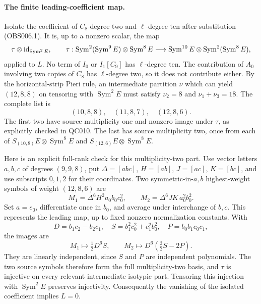 \paragraph{The finite leading-coefficient map.}
Isolate the coefficient of $C_8$-degree two and $\ell$-degree ten after
substitution (OBS006.1). It is, up to a nonzero scalar, the map
\[
 \tau\otimes{\rm id}_{\operatorname{Sym}^2 E},\qquad
 \tau:\operatorname{Sym}^2(\operatorname{Sym}^9 E)\otimes
              \operatorname{Sym}^8 E
       \longrightarrow
       \operatorname{Sym}^{10}E\otimes
              \operatorname{Sym}^2(\operatorname{Sym}^8 E),
\]
applied to $L$.
No term of $I_0$ or $I_1[C_9]$ has $\ell$-degree ten.
The contribution of $A_0$ involving two copies of $C_8$ has
$\ell$-degree two, so it does not contribute either.
By the horizontal-strip Pieri rule, an intermediate partition $\nu$
which can yield $(12,8,8)$ on tensoring with $\operatorname{Sym}^2 E$
must satisfy $\nu_2=8$ and $\nu_1+\nu_3=18$.
The complete list is
\[
 (10,8,8),\quad (11,8,7),\quad (12,8,6).
\]
The first two have source multiplicity one and nonzero image under
$\tau$, as explicitly checked in QC010.
The last has source multiplicity two, once from each of
$S_{(10,8)}E\otimes\operatorname{Sym}^8 E$ and
$S_{(12,6)}E\otimes\operatorname{Sym}^8 E$.

Here is an explicit full-rank check for this multiplicity-two part.
Use vector letters $a,b,c$ of degrees $(9,9,8)$, put
$\Delta=[abc]$, $H=[ab]$, $J=[ac]$, $K=[bc]$, and use subscripts $0,1,2$
for their coordinates. Two symmetric-in-$a,b$ highest-weight symbols of
weight $(12,8,6)$ are
\[
 M_1=\Delta^6H^2a_0b_0c_0^2,\qquad
 M_2=\Delta^6JK\,a_0^2b_0^2.
\]
Set $a=e_0$, differentiate once in $b_0$, and average under interchange
of $b,c$. This represents the leading map, up to fixed nonzero
normalization constants. With
\[
 D=b_1c_2-b_2c_1,\quad
 S=b_1^2c_0^2+c_1^2b_0^2,\quad
 P=b_0b_1c_0c_1,
\]
the images are
\[
 M_1\longmapsto \tfrac12D^6S,\qquad
 M_2\longmapsto D^6(\tfrac32S-2P).
\]
They are linearly independent, since $S$ and $P$ are independent
polynomials. The two source symbols therefore form the full
multiplicity-two basis, and $\tau$ is injective on every relevant
intermediate isotypic part. Tensoring this injection with
$\operatorname{Sym}^2 E$ preserves injectivity. Consequently the
vanishing of the isolated coefficient implies $L=0$.

